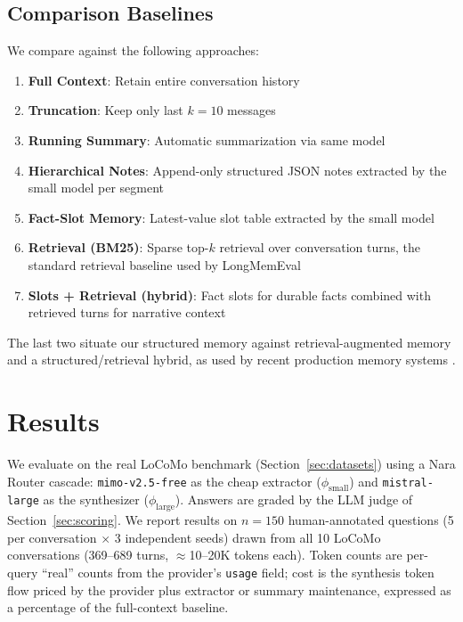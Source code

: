 \documentclass[conference]{IEEEtran}
\begin{document}
\subsection{Comparison Baselines}
\label{sec:baselines}

We compare against the following approaches:
\begin{enumerate}
    \item \textbf{Full Context}: Retain entire conversation history
    \item \textbf{Truncation}: Keep only last $k = 10$ messages
    \item \textbf{Running Summary}: Automatic summarization via same model \cite{acl2024}
    \item \textbf{Hierarchical Notes}: Append-only structured JSON notes extracted by the small model per segment
    \item \textbf{Fact-Slot Memory}: Latest-value slot table extracted by the small model
    \item \textbf{Retrieval (BM25)}: Sparse top-$k$ retrieval over conversation turns, the standard retrieval baseline used by LongMemEval \cite{wu2024longmemeval}
    \item \textbf{Slots + Retrieval (hybrid)}: Fact slots for durable facts combined with retrieved turns for narrative context
\end{enumerate}
The last two situate our structured memory against retrieval-augmented memory and a structured/retrieval hybrid, as used by recent production memory systems \cite{chhikara2025mem0}.

\section{Results}
\label{sec:results}

We evaluate on the real LoCoMo benchmark (Section~\ref{sec:datasets}) using a
Nara Router cascade: \texttt{mimo-v2.5-free} as the cheap extractor
($\phi_{\text{small}}$) and \texttt{mistral-large} as the
synthesizer ($\phi_{\text{large}}$). Answers are graded by the LLM judge of
Section~\ref{sec:scoring}. We report results on $n=150$ human-annotated questions
(5 per conversation $\times$ 3 independent seeds) drawn from all 10 LoCoMo conversations (369--689 turns,
$\approx$10--20K tokens each). Token counts are per-query ``real'' counts from
the provider's \texttt{usage} field; cost is the synthesis token flow priced by
the provider plus extractor or summary maintenance, expressed as a percentage
of the full-context baseline.
\end{document}
